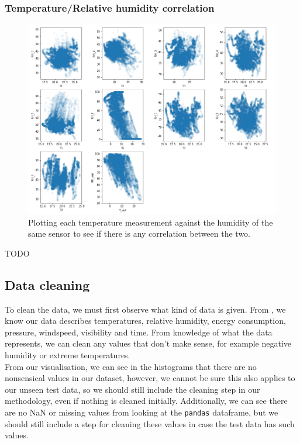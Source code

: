 \documentclass{article}
\newcommand{\n}[0]{\\[\baselineskip]}
\begin{document}
\subsubsection{Temperature/Relative humidity correlation}

\begin{figure}[H]
\centering
\includegraphics[width=1\textwidth, keepaspectratio]{imgs/t-rh-correlation.png}
\caption{Plotting each temperature measurement against the humidity of the same sensor to see if there is any correlation between the two.}
\end{figure}

TODO \cite{colinear}

\subsection{Data cleaning}
To clean the data, we must first observe what kind of data is given. From \cite{paper}, we know our data describes temperatures, relative humidity, energy consumption, pressure, windspeed, visibility and time. From knowledge of what the data represents, we can clean any values that don't make sense, for example negative humidity or extreme temperatures.
\n
From our visualisation, we can see in the histograms that there are no nonsensical values in our dataset, however, we cannot be sure this also applies to our unseen test data, so we should still include the cleaning step in our methodology, even if nothing is cleaned initially. Additionally, we can see there are no NaN or missing values from looking at the \texttt{pandas} dataframe, but we should still include a step for cleaning these values in case the test data has such values. 
\end{document}
